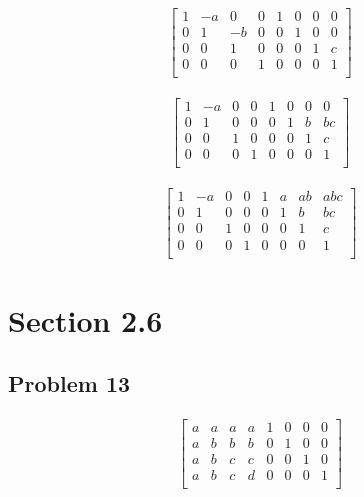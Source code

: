 \documentclass[a4paper,11pt]{article}
\begin{document}
\begin{align}
\left[
\begin{array}{cccc|cccc}
1 & -a & 0 & 0 & 1 & 0 & 0 & 0 \\
0 & 1 & -b & 0 & 0 & 1 & 0 & 0\\
0 & 0 & 1 & 0 & 0 & 0 & 1 & c\\
0 & 0 & 0 & 1 & 0 & 0 & 0 & 1\\
\end{array}
\right]
\end{align}

\begin{align}
\left[
\begin{array}{cccc|cccc}
1 & -a & 0 & 0 & 1 & 0 & 0 & 0 \\
0 & 1 & 0 & 0 & 0 & 1 & b & bc\\
0 & 0 & 1 & 0 & 0 & 0 & 1 & c\\
0 & 0 & 0 & 1 & 0 & 0 & 0 & 1\\
\end{array}
\right]
\end{align}

\begin{align}
\left[
\begin{array}{cccc|cccc}
1 & -a & 0 & 0 & 1 & a & ab & abc \\
0 & 1  & 0 & 0 & 0 & 1 & b & bc\\
0 & 0  & 1 & 0 & 0 & 0 & 1 & c\\
0 & 0  & 0 & 1 & 0 & 0 & 0 & 1\\
\end{array}
\right]
\end{align}

\section*{Section 2.6}
\subsection*{Problem 13}
\begin{align}
\left[
\begin{array}{cccc|cccc}
a & a & a & a & 1 & 0 & 0 & 0 \\
a & b & b & b & 0 & 1 & 0 & 0\\
a & b & c & c & 0 & 0 & 1 & 0\\
a & b & c & d & 0 & 0 & 0 & 1\\
\end{array}
\right]
\end{align}
\end{document}
